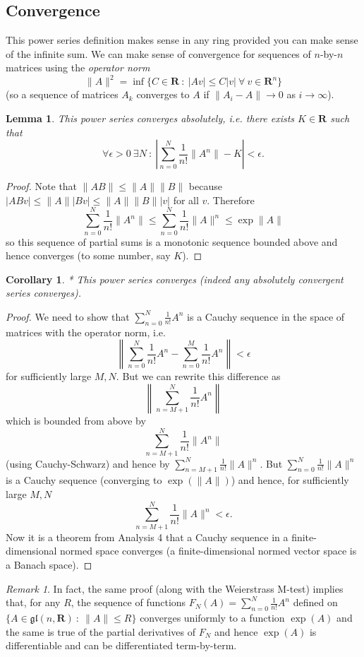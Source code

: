 \documentclass[12pt]{article}
\newcommand{\RR}{\mathbf{R}}
\newtheorem{lma}[thm]{Lemma}
\newtheorem{cor}[thm]{Corollary}
\theoremstyle{definition}
\theoremstyle{check}
\theoremstyle{remark}
\newtheorem{rmk}[thm]{Remark}
\theoremstyle{TheoremNum}
\begin{document}
\subsection{Convergence}

This power series definition makes sense in any ring provided you can make sense of the infinite sum. We can make sense of convergence for sequences of $n$-by-$n$ matrices using the {\em operator norm}
\[\|A\|^2=\inf\{C\in\RR\ :\ |Av|\leq C|v|\ \forall\ v\in \RR^n\}\]
(so a sequence of matrices $A_k$ converges to $A$ if $\|A_i-A\|\to 0$ as $i\to\infty$).

\begin{lma}
This power series converges absolutely, i.e. there exists $K\in\RR$ such that
\[\forall\epsilon>0\ \exists N\ :\ \left|\sum_{n=0}^N\frac{1}{n!}\|A^n\|-K\right|<\epsilon.\]
\end{lma}
\begin{proof}
Note that $\|AB\|\leq \|A\|\|B\|$ because $|ABv|\leq \|A\||Bv|\leq \|A\|\|B\||v|$ for all $v$. Therefore
\[\sum_{n=0}^N\frac{1}{n!}\|A^n\|\leq \sum_{n=0}^N\frac{1}{n!}\|A\|^n\leq\exp\|A\|\]
so this sequence of partial sums is a monotonic sequence bounded above and hence converges (to some number, say $K$).
\end{proof}
\begin{cor}*
This power series converges (indeed any absolutely convergent series converges).
\end{cor}
\begin{proof}
We need to show that $\sum_{n=0}^N\frac{1}{n!}A^n$ is a Cauchy sequence in the space of matrices with the operator norm, i.e.
\[\left\|\sum_{n=0}^N\frac{1}{n!}A^n-\sum_{n=0}^M\frac{1}{n!}A^n\right\|<\epsilon\]
for sufficiently large $M,N$.  But we can rewrite this difference as
\[\left\|\sum_{n=M+1}^N\frac{1}{n!}A^n\right\|\]
which is bounded from above by
\[\sum_{n=M+1}^N\frac{1}{n!}\|A^n\|\]
(using Cauchy-Schwarz) and hence by $\sum_{n=M+1}^N\frac{1}{n!}\|A\|^n$. But $\sum_{n=0}^{N}\frac{1}{n!}\|A\|^n$ is a Cauchy sequence (converging to $\exp(\|A\|)$) and hence, for sufficiently large $M,N$
\[\sum_{n=M+1}^N\frac{1}{n!}\|A\|^n<\epsilon.\]
Now it is a theorem from Analysis 4 that a Cauchy sequence in a finite-dimensional normed space converges (a finite-dimensional normed vector space is a Banach space).
\end{proof}

\begin{rmk}
In fact, the same proof (along with the Weierstrass M-test) implies that, for any $R$, the sequence of functions $F_N(A)=\sum_{n=0}^N\frac{1}{n!}A^n$ defined on $\{A\in\mathfrak{gl}(n,\RR)\ :\ \|A\|\leq R\}$ converges uniformly to a function $\exp(A)$ and the same is true of the partial derivatives of $F_N$ and hence $\exp(A)$ is differentiable and can be differentiated term-by-term.
\end{rmk} 
\end{document}
